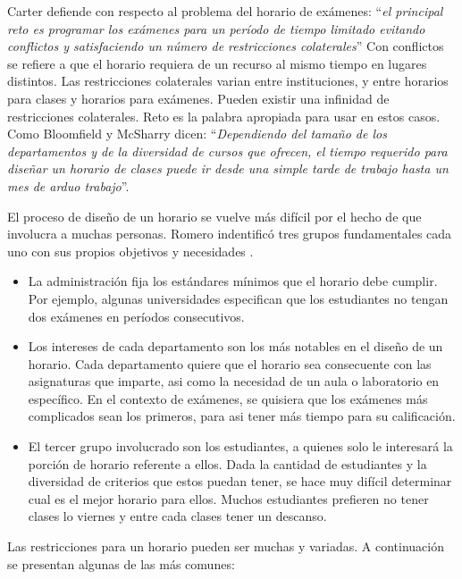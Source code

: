 Carter defiende con respecto al problema del horario de exámenes: ``\emph{el principal reto es programar los
exámenes para un período de tiempo limitado evitando conflictos y satisfaciendo un número de restricciones
colaterales}'' \cite{Carter's summary} Con conflictos se refiere a que el horario requiera de un recurso
al mismo tiempo en lugares distintos. Las restricciones colaterales varian entre instituciones, y entre
horarios para clases y horarios para exámenes. Pueden existir una infinidad de restricciones colaterales.
Reto es la palabra apropiada para usar en estos casos.
Como Bloomfield y McSharry dicen: ``\emph{Dependiendo del tamaño de los departamentos y de la diversidad
de cursos que ofrecen, el tiempo requerido para diseñar un horario de clases puede ir desde una simple
tarde de trabajo hasta un mes de arduo trabajo}''. \cite{Bloomfield and McSharry says}

El proceso de diseño de un horario se vuelve más difícil por el hecho de que involucra a muchas personas.
Romero indentificó tres grupos fundamentales cada uno con sus propios objetivos y necesidades \cite{Romero}.

\begin{itemize}
	\item La administración fija los estándares  mínimos que el horario debe cumplir. Por ejemplo, algunas
		universidades especifican que los estudiantes no tengan dos exámenes en períodos consecutivos.
	\item Los intereses de cada departamento son los más notables en el diseño de un horario. Cada departamento
		quiere que el horario sea consecuente con las asignaturas que imparte, asi como la necesidad de un
		aula o laboratorio en específico. En el contexto de exámenes, se quisiera que los exámenes más complicados
		sean los primeros, para asi tener más tiempo para su calificación.
	\item El tercer grupo involucrado son los estudiantes, a quienes solo le interesará la porción de horario
		referente a ellos. Dada la cantidad de estudiantes y la diversidad de criterios que estos puedan tener,
		se hace muy difícil determinar cual es el mejor horario para ellos. Muchos estudiantes prefieren no
		tener clases lo viernes y entre cada clases tener un descanso.		
\end{itemize}

Las restricciones para un horario pueden ser muchas y variadas. A continuación se presentan algunas de 
las más comunes:

